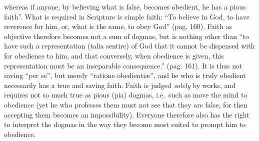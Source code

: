\documentclass[12pt,a4paper,openany]{book}
\newcommand{\opage}[1]{\marginnote{\footnotesize\textit{[#1]}}}
\begin{document}
\opage{157}\setcounter{footnote}{0}whereas if anyone, by believing what is false, becomes obedient, he has a pious faith''. What is required in Scripture is simple faith: ``To believe in God, to have reverence for him, or, what is the same, to obey God'' (pag. 160). Faith as objective therefore becomes not a sum of dogmas, but is nothing other than ``to have such a representation (talia sentire) of God that it cannot be dispensed with for obedience to him, and that conversely, when obedience is given, this representation must be an inseparable consequence.'' (pag. 161). It is thus not saving ``per se'', but merely ``ratione obedientiæ'', and he who is truly obedient necessarily has a true and saving faith. Faith is judged \emph{solely} by works, and requires not so much true as pious (pia) dogmas, i.e.\ such as move the mind to obedience (yet he who professes them must not see that they are false, for then accepting them becomes an impossibility). Everyone therefore also has the right to interpret the dogmas in the way they become most suited to prompt him to obedience. %
\end{document}
